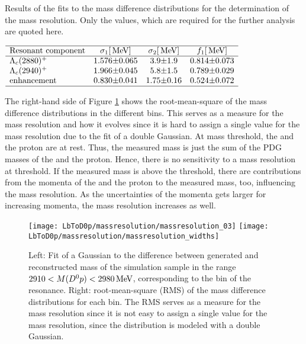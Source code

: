 \begin{table}[tb]
    \centering
    \caption{Results of the fits to the mass difference distributions for the determination of the mass resolution. Only the values, which are required for the further analysis are quoted here.}
    \label{tab:Massresolution}
    $\begin{array}{lr@{\pm}lr@{\pm}lr@{\pm}l}
    \hline
    \text{Resonant component} & \multicolumn{2}{c}{\sigma_1 [\mev]} & \multicolumn{2}{c}{\sigma_2 [\mev]} & \multicolumn{2}{c}{f_1 [\mev]} \\
    \hline
    \LcResI   & \MassresResIwIval & \MassresResIwIerr & \MassresResIwIIval & \MassresResIwIIerr & \MassresResIfIval & \MassresResIfIerr \\
    \LcResII   & \MassresResIIwIval & \MassresResIIwIerr & \MassresResIIwIIval & \MassresResIIwIIerr & \MassresResIIfIval & \MassresResIIfIerr \\
    \text{enhancement} & \MassresStructurewIval & \MassresStructurewIerr & \MassresStructurewIIval & \MassresStructurewIIerr & \MassresStructurefIval & \MassresStructurefIerr \\
    \hline
    \end{array}$
\end{table}
The right-hand side of Figure \ref{fig:massresolution} shows the root-mean-square of the mass difference distributions in the different bins.
This serves as a measure for the mass resolution and how it evolves since it is hard to assign a single value for the mass resolution due to the fit of a double Gaussian.
At \Dz\proton mass threshold, the \Dz and the proton are at rest.
Thus, the measured \Dz\proton mass is just the sum of the PDG masses of the \Dz and the proton.
Hence, there is no sensitivity to a mass resolution at threshold.
If the measured \Dz\proton mass is above the threshold, there are contributions from the momenta of the \Dz and the proton to the measured \Dz\proton mass, too, influencing the mass resolution.
As the uncertainties of the momenta gets larger for increasing momenta, the mass resolution increases as well.
\begin{figure}[tb]
    \centering
	\texttt{[image: LbToD0p/massresolution/massresolution\_03]}
	\texttt{[image: LbToD0p/massresolution/massresolution\_widths]}
	\caption{Left: Fit of a Gaussian to the difference between generated and reconstructed \Dz\proton mass of the simulation sample in the range $2910 < M({{D}^0}{p}) < 2980 \mathrm{\,Me\kern -0.1em V}$, corresponding to the bin of the \LcResII resonance. Right: root-mean-square (RMS) of the mass difference distributions for each bin.
    The RMS serves as a measure for the mass resolution since it is not easy to assign a single value for the mass resolution, since the distribution is modeled with a double Gaussian.}
    \label{fig:massresolution}
\end{figure}


